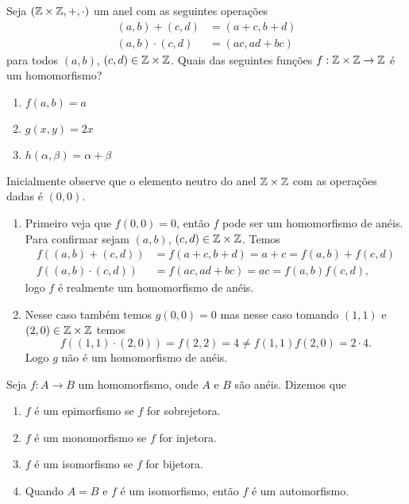 \begin{exemplo}
    Seja $(\mathbb{Z}\times\mathbb{Z}, +, \cdot)$ um anel com as seguintes opera\c{c}\~oes
    \begin{align*}
        (a, b) + (c, d) &= (a + c, b + d)\\
        (a, b)\cdot (c, d) &= (ac, ad + bc)
    \end{align*}
    para todos $(a, b)$, $(c, d) \in \mathbb{Z}\times\mathbb{Z}$.
    Quais das seguintes funções $f : \mathbb{Z}\times\mathbb{Z} \to \mathbb{Z}$ \'e um homomorfismo?
    \begin{enumerate}[label={\roman*})]
        \item $f(a, b) = a$

        \item $g(x, y) = 2x$

        \item $h(\alpha, \beta)= \alpha + \beta$
    \end{enumerate}
    \begin{solucao}
        Inicialmente observe que o elemento neutro do anel $\mathbb{Z} \times \mathbb{Z}$ com as operações dadas é $(0, 0)$.
        \begin{enumerate}
            \item Primeiro veja que $f(0, 0) = 0$, então $f$ pode ser um homomorfismo de anéis. Para confirmar sejam $(a, b)$, $(c, d) \in \mathbb{Z} \times \mathbb{Z}$. Temos
                \begin{align*}
                    f((a, b) + (c, d)) &= f(a + c, b + d) = a + c = f(a, b) + f(c, d)\\
                    f((a, b) \cdot (c, d)) &= f(ac, ad + bc) = ac = f(a, b)f(c, d),
                \end{align*}
                logo $f$ é realmente um homomorfismo de anéis.

            \item Nesse caso também temos $g(0, 0) = 0$ mas nesse caso tomando $(1, 1)$ e $(2,0) \in \mathbb{Z} \times \mathbb{Z}$ temos
                \[
                    f((1, 1) \cdot (2, 0)) = f(2, 2) = 4 \ne f(1,1)f(2,0)=2\cdot 4.
                \]
                Logo $g$ não é um homomorfismo de anéis.
        \end{enumerate}
    \end{solucao}
\end{exemplo}


\begin{definicao}Seja $f:A\rightarrow B$ um homomorfismo, onde $A$ e $B$ s{\~a}o an{\'e}is. Dizemos que
	\begin{enumerate}[label={\roman*})]
		\item $f$ {\'e} um epimorfismo se $f$ for sobrejetora.
		\item $f$ {\'e} um monomorfismo se $f$ for injetora.
		\item $f$ {\'e} um isomorfismo se $f$ for bijetora.
		\item Quando $A=B$ e $f$ {\'e} um isomorfismo, ent{\~a}o $f$ {\'e} um automorfismo.
	\end{enumerate}
\end{definicao}

